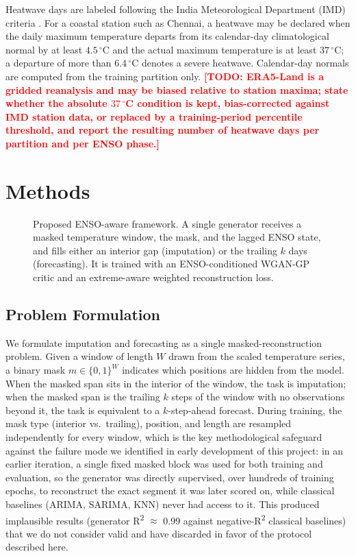 \documentclass[conference]{IEEEtran}
\newcommand{\TODO}[1]{\textcolor{red}{\textbf{[TODO: #1]}}}
\begin{document}
Heatwave days are labeled following the India Meteorological Department (IMD) criteria
\cite{imd2024heatwave}. For a coastal station such as Chennai, a heatwave may be declared when the
daily maximum temperature departs from its calendar-day climatological normal by at least
$4.5\,^{\circ}$C and the actual maximum temperature is at least $37\,^{\circ}$C; a departure of more
than $6.4\,^{\circ}$C denotes a severe heatwave. Calendar-day normals are computed from the training
partition only. \TODO{ERA5-Land is a gridded reanalysis and may be biased relative to station maxima;
state whether the absolute $37\,^{\circ}$C condition is kept, bias-corrected against IMD station data,
or replaced by a training-period percentile threshold, and report the resulting number of heatwave days
per partition and per ENSO phase.}

\section{Methods}
\label{sec:methods}

\begin{figure}[t]
\centering
\resizebox{\columnwidth}{!}{}
\caption{Proposed ENSO-aware framework. A single generator receives a masked temperature window, the
mask, and the lagged ENSO state, and fills either an interior gap (imputation) or the trailing $k$ days
(forecasting). It is trained with an ENSO-conditioned WGAN-GP critic and an extreme-aware weighted
reconstruction loss.}
\label{fig:framework}
\end{figure}

\subsection{Problem Formulation}

We formulate imputation and forecasting as a single masked-reconstruction problem. Given a window of
length $W$ drawn from the scaled temperature series, a binary mask $m \in \{0,1\}^W$ indicates which
positions are hidden from the model. When the masked span sits in the interior of the window, the task
is imputation; when the masked span is the trailing $k$ steps of the window with no observations beyond
it, the task is equivalent to a $k$-step-ahead forecast. During training, the mask type (interior vs.\
trailing), position, and length are resampled independently for every window, which is the key
methodological safeguard against the failure mode we identified in early development of this project:
in an earlier iteration, a single fixed masked block was used for both training and evaluation, so the
generator was directly supervised, over hundreds of training epochs, to reconstruct the exact segment it
was later scored on, while classical baselines (ARIMA, SARIMA, KNN) never had access to it. This produced
implausible results (generator R\textsuperscript{2} $\approx$ 0.99 against negative-R\textsuperscript{2}
classical baselines) that we do not consider valid and have discarded in favor of the protocol described
here.
\end{document}
